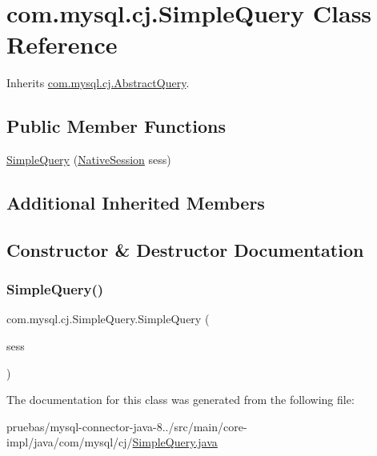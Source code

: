 \hypertarget{classcom_1_1mysql_1_1cj_1_1_simple_query}{}\section{com.\+mysql.\+cj.\+Simple\+Query Class Reference}
\label{classcom_1_1mysql_1_1cj_1_1_simple_query}


Inherits \mbox{\hyperlink{classcom_1_1mysql_1_1cj_1_1_abstract_query}{com.\+mysql.\+cj.\+Abstract\+Query}}.

\subsection*{Public Member Functions}
\begin{DoxyCompactItemize}
\item 
\mbox{\hyperlink{classcom_1_1mysql_1_1cj_1_1_simple_query_a29fa70f647a733acfe90348e063e2e56}{Simple\+Query}} (\mbox{\hyperlink{classcom_1_1mysql_1_1cj_1_1_native_session}{Native\+Session}} sess)
\end{DoxyCompactItemize}
\subsection*{Additional Inherited Members}


\subsection{Constructor \& Destructor Documentation}
\mbox{\label{classcom_1_1mysql_1_1cj_1_1_simple_query_a29fa70f647a733acfe90348e063e2e56}} 
\subsubsection{\texorpdfstring{Simple\+Query()}{SimpleQuery()}}
{\footnotesize\ttfamily com.\+mysql.\+cj.\+Simple\+Query.\+Simple\+Query (\begin{DoxyParamCaption}\item[{\mbox{\hyperlink{classcom_1_1mysql_1_1cj_1_1_native_session}{Native\+Session}}}]{sess }\end{DoxyParamCaption})}



The documentation for this class was generated from the following file\+:\begin{DoxyCompactItemize}
\item 
pruebas/mysql-\/connector-\/java-\/8../src/main/core-\/impl/java/com/mysql/cj/\mbox{\hyperlink{_simple_query_8java}{Simple\+Query.\+java}}\end{DoxyCompactItemize}
